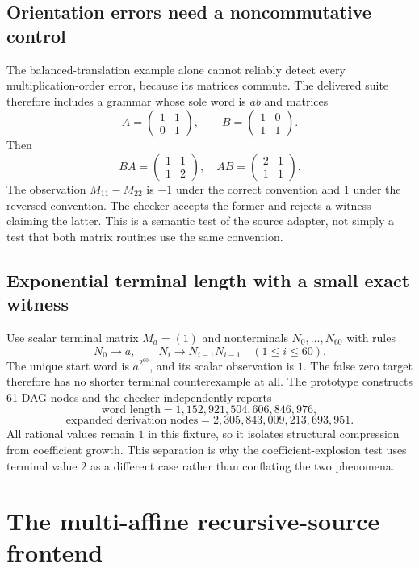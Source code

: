 \documentclass[11pt,letterpaper]{article}
\theoremstyle{definition}\newtheorem{definition}[theorem]{Definition}
\theoremstyle{remark}\newtheorem{remark}[theorem]{Remark}
\begin{document}
\subsection{Orientation errors need a noncommutative control}
The balanced-translation example alone cannot reliably detect every multiplication-order error, because its matrices commute. The delivered suite therefore includes a grammar whose sole word is $ab$ and matrices
\[
 A=\begin{pmatrix}1&1\\0&1\end{pmatrix},\qquad
 B=\begin{pmatrix}1&0\\1&1\end{pmatrix}.
\]
Then
\[
 BA=\begin{pmatrix}1&1\\1&2\end{pmatrix},\quad
 AB=\begin{pmatrix}2&1\\1&1\end{pmatrix}.
\]
The observation $M_{11}-M_{22}$ is $-1$ under the correct convention and $1$ under the reversed convention. The checker accepts the former and rejects a witness claiming the latter. This is a semantic test of the source adapter, not simply a test that both matrix routines use the same convention.

\subsection{Exponential terminal length with a small exact witness}
Use scalar terminal matrix $M_a=(1)$ and nonterminals $N_0,\ldots,N_{60}$ with rules
\[
 N_0\to a,\qquad N_i\to N_{i-1}N_{i-1}\quad(1\le i\le60).
\]
The unique start word is $a^{2^{60}}$, and its scalar observation is $1$. The false zero target therefore has no shorter terminal counterexample at all. The prototype constructs 61 DAG nodes and the checker independently reports
\[
 \text{word length}=1{,}152{,}921{,}504{,}606{,}846{,}976,
\]
\[
 \text{expanded derivation nodes}=2{,}305{,}843{,}009{,}213{,}693{,}951.
\]
All rational values remain $1$ in this fixture, so it isolates structural compression from coefficient growth. This separation is why the coefficient-explosion test uses terminal value $2$ as a different case rather than conflating the two phenomena.

\section{The multi-affine recursive-source frontend}
\label{sec:frontend}
\end{document}
